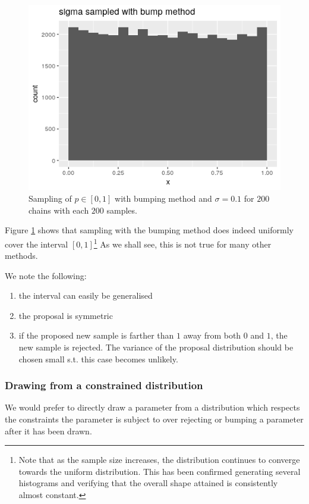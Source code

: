 \begin{figure}
	\centering
	\includegraphics[height = 0.3\textheight]{img/bumpItBaby.png}
	\caption{Sampling of $p \in [0,1]$ with bumping method and $\sigma= 0.1$ for $200$ chains with each $200$ samples. }
	\label{fig:bumpingIsUniform}
\end{figure}

Figure \ref{fig:bumpingIsUniform} shows that sampling with the bumping method does indeed uniformly cover the interval $[0,1]$\footnote{Note that as the sample size increases, the distribution continues to converge towards the uniform distribution. This has been confirmed generating several histograms and verifying that the overall shape attained is consistently almost constant.}
As we shall see, this is not true for many other methods. 

We note the following:
\begin{enumerate}
	\item the interval can easily be generalised
	\item the proposal is symmetric
	\item if the proposed new sample is farther than $1$ away from both $0$ and $1$, the new sample is rejected. The variance of the proposal distribution should be chosen small s.t. this case becomes unlikely.
\end{enumerate}



\subsubsection{Drawing from a constrained distribution}
We would prefer to directly draw a parameter from a distribution which respects the constraints the parameter is subject to over rejecting or bumping a parameter after it has been drawn. 

